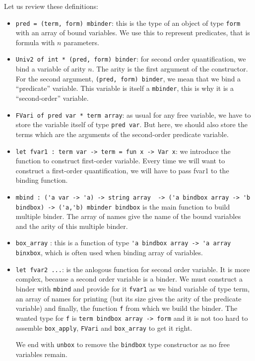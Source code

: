 \documentclass[11pt]{article}
\begin{document}
Let us review these definitions:
\begin{itemize}
\item \verb#pred = (term, form) mbinder#: this is the type of an object
of type \verb#form# with an array of bound variables. We use this to
represent predicates, that is formula with $n$ parameters.

\item \verb#Univ2 of int * (pred, form) binder#: for second order
quantification, we bind a variable of arity $n$. The arity is the
first argument of the constructor. For the second argument,
\verb#(pred, form) binder#, we mean that we bind a ``predicate''
variable. This variable is
itself a \verb#mbinder#, this is why it is a ``second-order'' variable.

\item \verb#FVari of pred var * term array#: as usual
for any free variable, we have to store
the variable itself of type \verb#pred var#.
But here, we should also store the terms which
are the arguments of the second-order predicate variable.

\item \verb#let fvar1 : term var -> term = fun x -> Var x#: we introduce the
function to construct first-order variable. Every time we will want to
construct a first-order quantification, we will have to pass fvar1 to
the binding function.

\item \verb#mbind : ('a var -> 'a) -> string array  -> ('a bindbox array -> 'b bindbox) -> ('a,'b) mbinder bindbox# is
  the main function to build multiple binder. The array of names give
  the name of the bound variables and the arity of this multiple binder.

\item \verb#box_array# : this is a function of type
  \verb#'a bindbox array -> 'a array binxbox#, which is often used when
  binding array of variables.

\item \verb#let fvar2 ...#: is the anlogous function for second order
  variable. It is more complex, because a second order variable is a
  binder. We must construct a binder with \verb#mbind# and provide for
  it \verb#fvar1# as we bind variable of type term, an array of names for
  printing
  (but its size gives the arity of the predicate variable) and
  finally, the function \verb#f# from which we build the binder. The wanted
  type for \verb#f# is \verb#term bindbox array -> form# and it is not
  too hard to assemble \verb#box_apply#, \verb#FVari# and
  \verb#box_array# to get it right.

  We end with \verb#unbox# to remove the \verb#bindbox# type
  constructor as no free variables remain.
\end{itemize}
\end{document}
